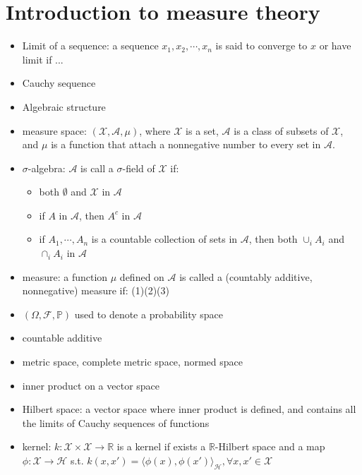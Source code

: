 \documentclass{article}
\begin{document}
\section{Introduction to measure theory}
\begin{itemize}
    \item Limit of a sequence: a sequence $x_1, x_2, \cdots, x_n$ is said to converge to $x$ or have limit if ...
    \item Cauchy sequence
    \item Algebraic structure
    \item measure space: $(\mathcal{X}, \mathcal{A}, \mu)$, where $\mathcal{X}$ is a set, $\mathcal{A}$ is a class of subsets of $\mathcal{X}$, and $\mu$ is a function that attach a nonnegative number to every set in $\mathcal{A}$.
    \item $\sigma$-algebra: $\mathcal{A}$ is call a $\sigma$-field of $\mathcal{X}$ if: 
    \begin{itemize}
        \item both $\emptyset$ and $\mathcal{X}$ in $\mathcal{A}$
        \item if $A$ in $\mathcal{A}$, then $A^c$ in $\mathcal{A}$ 
        \item if $A_1, \cdots, A_n$ is a countable collection of sets in $\mathcal{A}$, then both $\cup_i A_i$ and $\cap_i A_i$ in $\mathcal{A}$ 
    \end{itemize}
    \item measure: a function $\mu$  defined on $\mathcal{A}$ is called a (countably additive, nonnegative) measure if: (1)\quad (2)\quad (3)
    \item $(\Omega, \mathcal{F}, \mathbb{P})$ used to denote a probability space
    \item countable additive
    \item metric space, complete metric space, normed space
    \item inner product on a vector space
    \item Hilbert space: a vector space where inner product is defined, and contains all the limits of Cauchy sequences of functions
    \item kernel: $k: \mathcal{X} \times \mathcal{X} \to \mathbb{R}$ is a kernel if exists a $\mathbb{R}$-Hilbert space and a map $\phi: \mathcal{X} \to 
    \mathcal{H}$ s.t. $k(x, x') = \langle \phi(x), \phi(x') \rangle_{\mathcal{H}}, \forall x, x' \in \mathcal{X}$ 
\end{itemize}
\end{document}

